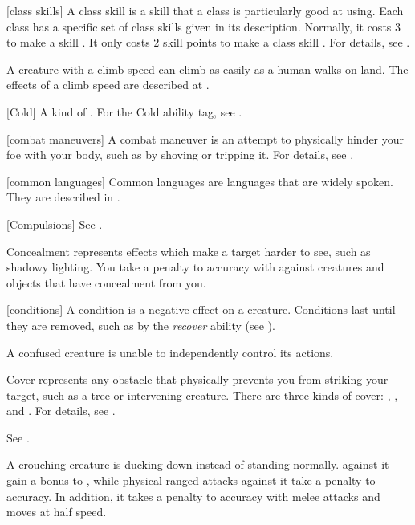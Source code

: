 [class skills] A class skill is a skill that a class is particularly good at using.
Each class has a specific set of class skills given in its description.
Normally, it costs 3  to make a skill .
It only costs 2 skill points to make a class skill .
For details, see .

 A creature with a climb speed can climb as easily as a human walks on land.
The effects of a climb speed are described at .

[Cold] A kind of . For the Cold ability tag, see .

[combat maneuvers] A combat maneuver is an attempt to physically hinder your foe with your body, such as by shoving or tripping it.
For details, see .

[common languages] Common languages are languages that are widely spoken.
They are described in .

[Compulsions] See .

 Concealment represents effects which make a target harder to see, such as shadowy lighting.
You take a  penalty to accuracy with  against creatures and objects that have concealment from you.

[conditions] A condition is a negative effect on a creature.
Conditions last until they are removed, such as by the \textit{recover} ability (see ).

 A confused creature is unable to independently control its actions. \confusionexplanation

 Cover represents any obstacle that physically prevents you from striking your target, such as a tree or intervening creature.
There are three kinds of cover: , , and .
For details, see .

 See .

 A crouching creature is ducking down instead of standing normally.
 against it gain a  bonus to , while physical ranged attacks against it take a  penalty to accuracy.
In addition, it takes a  penalty to accuracy with melee attacks and moves at half speed.

